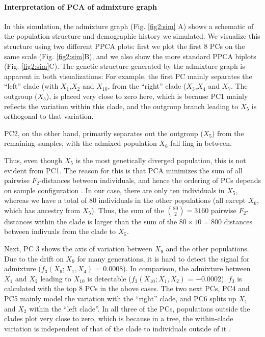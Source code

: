 \documentclass[12pt, letterpaper]{article}
\begin{document}
\paragraph{Interpretation of PCA of admixture graph}
In this simulation, the admixture graph (Fig. \ref{fig2:sim} A) shows a schematic of the population structure and demographic history we simulated.  We visualize this structure using two different PPCA plots: first we plot the first 8 PCs on the same scale (Fig. \ref{fig2:sim}B), and we also show the more standard PPCA biplots (Fig. \ref{fig2:sim}C). The genetic structure generated by the admixture graph is apparent in both visualizations: For example, the first PC mainly separates  the ``left'' clade (with $X_1$,$X_2$ and $X_{10}$, from the ``right'' clade ($X_3$,$X_4$ and $X_7$. The outgroup ($X_5$), is placed very close to zero here, which is because PC1 mainly reflects the variation within this clade, and the outgroup branch leading to $X_5$ is orthogonal to that variation. 

PC2, on the other hand, primarily separates out the outgroup ($X_5$) from the remaining samples, with the admixed population $X_6$ fall ling in between.

Thus, even though $X_5$ is the most genetically diverged population, this is not evident from PC1. The reason for this is that PCA minimizes the sum of all pairwise $F_2$-distances between individuals, and hence the ordering of PCs depends on sample configuration \cite{mcvean_genealogical_2009, elhaik_principal_2022}. In our case, there are only ten individuals in $X_5$, whereas we have a total of 80 individuals in the other populations (all except $X_6$, which has ancestry from $X_5$). Thus, the sum of the $\binom{80}{2}=3160$ pairwise $F_2$-distances within the clade is larger than the sum of the $80 \times 10 = 800$ distances between indivuals from the clade to $X_5$. 

Next, PC 3 shows the axis of variation between $X_9$ and the other populations. Due to the drift on $X_9$ for many generations, it is hard to detect the signal for admixture ($f_3(X_9; X_1, X_4)$ = $0.0008$). In comparison, the admixture between $X_1$ and $X_2$ leading to $X_{10}$ is detectable ($f_3(X_10; X_1, X_2)$ = $-0.0002$). $f_3$ is calculated with the top 8 PCs in the above cases. The two next PCs, PC4 and PC5 mainly model the variation with the ``right'' clade, and PC6 splits up $X_1$ and $X_2$ within the ``left clade''. In all three of the PCs, populations outside the clades plot very close to zero, which is because in a tree, the within-clade variation is independent of that of the clade to individuals outside of it \citep{felsenstein_maximum-likelihood_1973}. 
\end{document}
